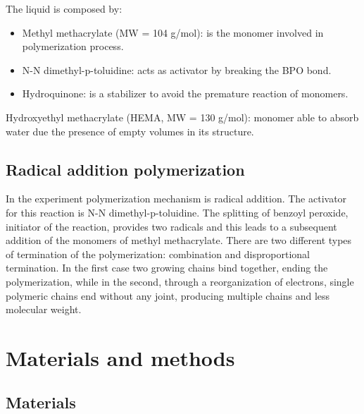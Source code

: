\documentclass[a4paper, 11pt]{article}
\begin{document}
\newpage

The liquid is composed by:
\begin{itemize}
\item Methyl methacrylate (MW = 104 g/mol): is the monomer involved in polymerization process. 
\begin{figure}[h!]
\centering
{} 
\end{figure}
\item N-N dimethyl-p-toluidine: acts as activator by breaking the BPO bond.
\item Hydroquinone: is a stabilizer to avoid the premature reaction of monomers.
\end{itemize}
Hydroxyethyl methacrylate (HEMA, MW = 130 g/mol): monomer able to absorb water due the presence of empty volumes in its structure. 
\begin{figure}[h]
\centering
{} 
\end{figure}

\subsection{Radical addition polymerization}

In the experiment polymerization mechanism is radical addition. The activator for this reaction is N-N dimethyl-p-toluidine. The splitting of benzoyl peroxide, initiator of the reaction, provides two radicals and this leads to a subsequent addition of the monomers of methyl methacrylate. There are two different types of termination of the polymerization: combination and disproportional termination. In the first case two growing chains bind together, ending the polymerization, while in the second, through a reorganization of electrons, single polymeric chains end without any joint, producing multiple chains and less molecular weight.

\section{Materials and methods}

\subsection{Materials}
\end{document}
